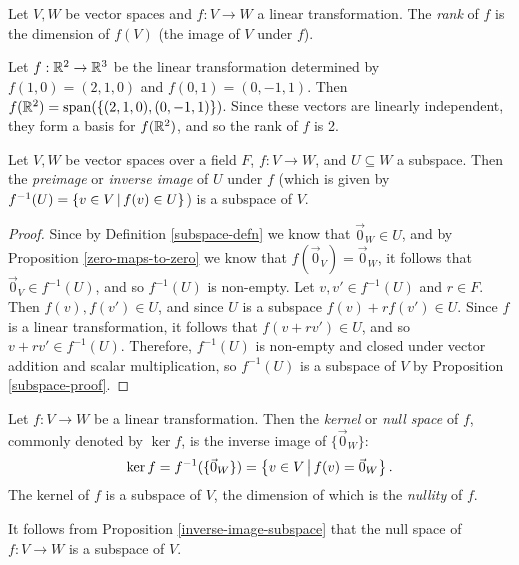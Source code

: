 \begin{defn}
    Let $V, W$ be vector spaces and $f: V \to W$ a linear transformation. The \emph{rank} of $f$ is the dimension of $f(V)$ (the image of $V$ under $f$).
\end{defn}

\begin{exmp}
    Let $f: \mathbb{R}^2 \to \mathbb{R}^3$ be the linear transformation determined by $f(1, 0) = (2, 1, 0)$ and $f(0, 1) = (0, -1, 1)$. Then $f(\mathbb{R}^2) = \operatorname{span}(\{(2, 1, 0), (0, -1, 1)\})$. Since these vectors are linearly independent, they form a basis for $f(\mathbb{R}^2)$, and so the rank of $f$ is 2.
\end{exmp}

\begin{prop}\label{inverse-image-subspace}
    Let $V, W$ be vector spaces over a field $F$, $f: V \to W$, and $U \subseteq W$ a subspace. Then the \emph{preimage} or \emph{inverse image} of $U$ under $f$ (which is given by $f^{-1}(U) = \left\{v \in V \,\middle|\, f(v) \in U\right\}$) is a subspace of $V$.
\end{prop}

\begin{proof}
    Since by Definition \ref{subspace-defn} we know that $\vec{0}_W \in U$, and by Proposition \ref{zero-maps-to-zero} we know that $f(\vec{0}_V) = \vec{0}_W$, it follows that $\vec{0}_V \in f^{-1}(U)$, and so $f^{-1}(U)$ is non-empty. Let $v, v' \in f^{-1}(U)$ and $r \in F$. Then $f(v), f(v') \in U$, and since $U$ is a subspace $f(v) + rf(v') \in U$. Since $f$ is a linear transformation, it follows that $f(v + rv') \in U$, and so $v + rv' \in f^{-1}(U)$. Therefore, $f^{-1}(U)$ is non-empty and closed under vector addition and scalar multiplication, so $f^{-1}(U)$ is a subspace of $V$ by Proposition \ref{subspace-proof}.
\end{proof}

\begin{defn}
    Let $f: V \to W$ be a linear transformation. Then the \emph{kernel} or \emph{null space} of $f$, commonly denoted by $\ker f$, is the inverse image of $\{\vec{0}_W\}$: \[\ker f = f^{-1}(\{\vec{0}_W\}) = \left\{v \in V \,\middle|\, f(v) = \vec{0}_W\right\}.\] The kernel of $f$ is a subspace of $V$, the dimension of which is the \emph{nullity} of $f$.
\end{defn}

\begin{rmk}
    It follows from Proposition \ref{inverse-image-subspace} that the null space of $f: V \to W$ is a subspace of $V$.
\end{rmk}


